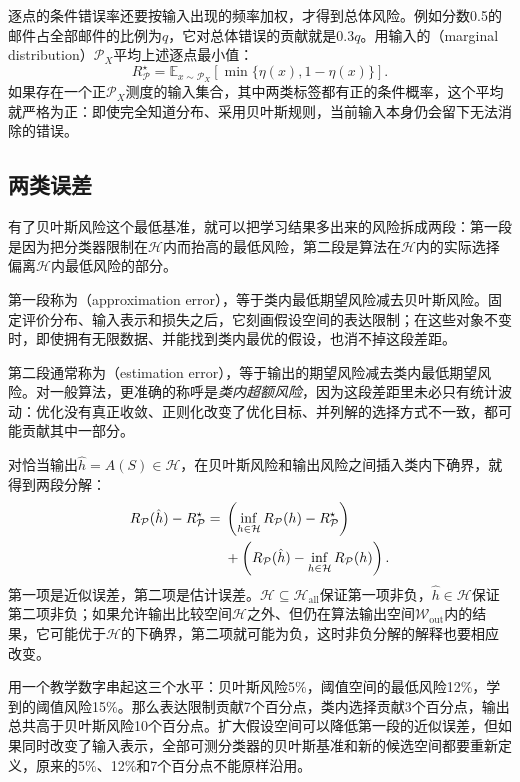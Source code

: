 逐点的条件错误率还要按输入出现的频率加权，才得到总体风险。例如分数0.5的邮件占全部邮件的比例为$q$，它对总体错误的贡献就是$0.3q$。用输入的（marginal distribution）$\mathcal P_X$平均上述逐点最小值：
\[
 R_{\mathcal P}^\star=
 \mathbb E_{x\sim\mathcal P_X}[\min\{\eta(x),1-\eta(x)\}].
\]
如果存在一个正$\mathcal P_X$测度的输入集合，其中两类标签都有正的条件概率，这个平均就严格为正：即使完全知道分布、采用贝叶斯规则，当前输入本身仍会留下无法消除的错误。

\subsection{两类误差}

有了贝叶斯风险这个最低基准，就可以把学习结果多出来的风险拆成两段：第一段是因为把分类器限制在$\mathcal H$内而抬高的最低风险，第二段是算法在$\mathcal H$内的实际选择偏离$\mathcal H$内最低风险的部分。

第一段称为（approximation error），等于类内最低期望风险减去贝叶斯风险。固定评价分布、输入表示和损失之后，它刻画假设空间的表达限制；在这些对象不变时，即使拥有无限数据、并能找到类内最优的假设，也消不掉这段差距。

第二段通常称为（estimation error），等于输出的期望风险减去类内最低期望风险。对一般算法，更准确的称呼是\emph{类内超额风险}，因为这段差距里未必只有统计波动：优化没有真正收敛、正则化改变了优化目标、并列解的选择方式不一致，都可能贡献其中一部分。

对恰当输出$\hat h=A(S)\in\mathcal H$，在贝叶斯风险和输出风险之间插入类内下确界，就得到两段分解：
\begin{align}
 R_{\mathcal P}(\hat h)-R_{\mathcal P}^\star
 ={}&\left(\inf_{h\in\mathcal H}R_{\mathcal P}(h)-R_{\mathcal P}^\star\right)
 \label{eq:approximation-estimation-decomposition}\\
 &+\left(R_{\mathcal P}(\hat h)-\inf_{h\in\mathcal H}R_{\mathcal P}(h)\right).
 \notag
\end{align}
第一项是近似误差，第二项是估计误差。$\mathcal H\subseteq\mathcal H_{\mathrm{all}}$保证第一项非负，$\hat h\in\mathcal H$保证第二项非负；如果允许输出比较空间$\mathcal H$之外、但仍在算法输出空间$\mathcal W_{\mathrm{out}}$内的结果，它可能优于$\mathcal H$的下确界，第二项就可能为负，这时非负分解的解释也要相应改变。

用一个教学数字串起这三个水平：贝叶斯风险5\%，阈值空间的最低风险12\%，学到的阈值风险15\%。那么表达限制贡献7个百分点，类内选择贡献3个百分点，输出总共高于贝叶斯风险10个百分点。扩大假设空间可以降低第一段的近似误差，但如果同时改变了输入表示，全部可测分类器的贝叶斯基准和新的候选空间都要重新定义，原来的5\%、12\%和7个百分点不能原样沿用。

